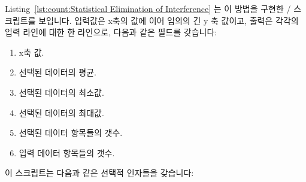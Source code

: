 Listing~\ref{lst:count:Statistical Elimination of Interference} 는 이 방법을
구현한 / 스크립트를 보입니다.
입력값은 x축의 값에 이어 임의의 긴 y 축 값이고, 출력은 각각의 입력 라인에 대한
한 라인으로, 다음과 같은 필드를 갖습니다:

\begin{enumerate}
\item	x축 값.
\item	선택된 데이터의 평균.
\item	선택된 데이터의 최소값.
\item	선택된 데이터의 최대값.
\item	선택된 데이터 항목들의 갯수.
\item	입력 데이터 항목들의 갯수.

\end{enumerate}

이 스크립트는 다음과 같은 선택적 인자들을 갖습니다:

